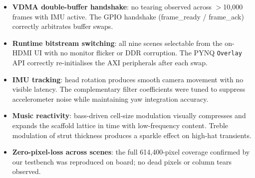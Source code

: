 \begin{itemize}
\item \textbf{VDMA double-buffer handshake}: no tearing observed across
  $>$10{,}000 frames with IMU active. The GPIO handshake (frame\_ready /
  frame\_ack) correctly arbitrates buffer swaps.

\item \textbf{Runtime bitstream switching}: all nine scenes selectable from
  the on-HDMI UI with no monitor flicker or DDR corruption. The PYNQ
  \texttt{Overlay} API correctly re-initialises the AXI peripherals after
  each swap.

\item \textbf{IMU tracking}: head rotation produces smooth camera movement
  with no visible latency. The complementary filter coefficients were tuned
  to suppress accelerometer noise while maintaining yaw integration accuracy.

\item \textbf{Music reactivity}: bass-driven cell-size modulation visually
  compresses and expands the scaffold lattice in time with low-frequency
  content. Treble modulation of strut thickness produces a sparkle effect on
  high-hat transients.

\item \textbf{Zero-pixel-loss across scenes}: the full 614{,}400-pixel
  coverage confirmed by our testbench was reproduced on board; no dead
  pixels or column tears observed.
\end{itemize}
